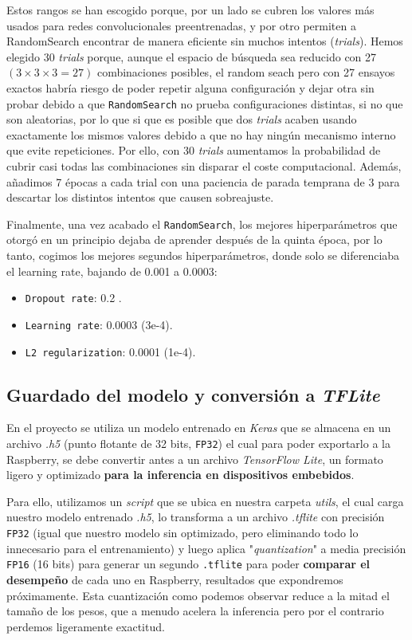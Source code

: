 Estos rangos se han escogido porque, por un lado se cubren los valores más usados para redes convolucionales preentrenadas, y por otro permiten a RandomSearch encontrar de manera eficiente sin muchos intentos (\textit{trials}). Hemos elegido 30 \textit{trials} porque, aunque el espacio de búsqueda sea reducido con 27 $(3\times3\times3 = 27)$ combinaciones posibles, el random seach  pero con 27 ensayos exactos habría riesgo de poder repetir alguna configuración y dejar otra sin probar debido a que \texttt{RandomSearch} no prueba configuraciones distintas, si no que son aleatorias, por lo que si que es posible que dos \textit{trials} acaben usando exactamente los mismos valores debido a que no hay ningún mecanismo interno que evite repeticiones. Por ello, con 30 \textit{trials} aumentamos la probabilidad de cubrir casi todas las combinaciones sin disparar el coste computacional. Además, añadimos 7 épocas a cada trial con una paciencia de parada temprana de 3 para descartar los distintos intentos que causen sobreajuste.

Finalmente, una vez acabado el \texttt{RandomSearch}, los mejores hiperparámetros que otorgó en un principio dejaba de aprender después de la quinta época, por lo tanto, cogimos los mejores segundos hiperparámetros, donde solo se diferenciaba el learning rate, bajando de 0.001 a 0.0003:

\begin{itemize}
    \item \texttt{Dropout rate}: 0.2 .
    \item \texttt{Learning rate}: 0.0003 (3e-4).
    \item \texttt{L2 regularization}: 0.0001 (1e-4).
\end{itemize}

\subsection{Guardado del modelo y conversión a \textit{TFLite}}
En el proyecto se utiliza un modelo entrenado en \textit{Keras} que se almacena en un archivo \textit{.h5} (punto flotante de 32 bits, \texttt{FP32}) el cual para poder exportarlo a la Raspberry, se debe convertir antes a un archivo \textit{TensorFlow Lite}, un formato ligero y optimizado \textbf{para la inferencia en dispositivos embebidos}. 

Para ello, utilizamos un \textit{script} que se ubica en nuestra carpeta \textit{utils}, el cual carga nuestro modelo entrenado \textit{.h5}, lo transforma a un archivo \textit{.tflite} con precisión \texttt{FP32} (igual que nuestro modelo sin optimizado, pero eliminando todo lo innecesario para el entrenamiento) y luego aplica "\textit{quantization}" a media precisión \texttt{FP16} (16 bits) para generar un segundo \texttt{.tflite} para poder \textbf{comparar el desempeño} de cada uno en Raspberry, resultados que expondremos próximamente. Esta cuantización como podemos observar reduce a la mitad el tamaño de los pesos, que a menudo acelera la inferencia pero por el contrario perdemos ligeramente exactitud. 

